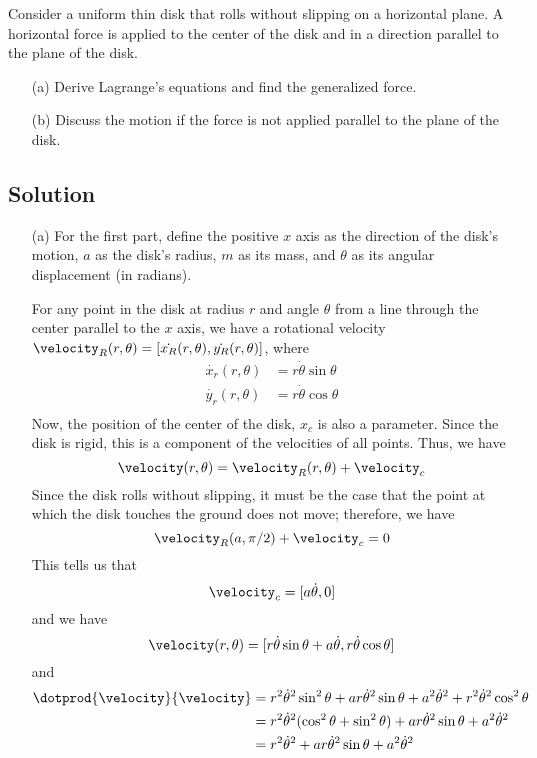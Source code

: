 Consider a uniform thin disk that rolls without slipping on a
horizontal plane.  A horizontal force is applied to the center of the
disk and in a direction parallel to the plane of the disk.
\begin{itemize}
\item[(a)] Derive Lagrange's equations and find the generalized force.
\item[(b)] Discuss the motion if the force is not applied parallel to the
  plane of the disk.
\end{itemize}

\subsection*{Solution}
\begin{itemize}
\item[(a)]
  For the first part, define the positive $x$ axis as the direction of
  the disk's motion, $a$ as the disk's radius, $m$ as its mass, and
  $\theta$ as its angular displacement (in radians).

  For any point in the disk at radius $r$ and angle $\theta$ from a line
  through the center parallel to the $x$ axis, we have a rotational
  velocity $\velocity_R(r, \theta) = [\dot{x_R}(r, \theta), \dot{y_R}(r,
    \theta)]$, where
  \begin{align*}
    \dot{x_r}(r, \theta) &= r\dot{\theta}\sin{\theta} \\
    \dot{y_r}(r, \theta) &= r\dot{\theta}\cos{\theta} \\
  \end{align*}
  Now, the position of the center of the disk, $x_c$ is also a
  parameter.  Since the disk is rigid, this is a component of the
  velocities of all points.  Thus, we have
  \[ \velocity(r, \theta) = \velocity_R(r, \theta) + \velocity_c \]
  Since the disk rolls without slipping, it must be the case that the
  point at which the disk touches the ground does not move; therefore,
  we have
  \[ \velocity_R(a, \pi/2) + \velocity_c = 0 \]
  This tells us that
  \[ \velocity_c = [a\dot{\theta}, 0] \]
  and we have
  \[
  \velocity(r, \theta) =
  [
    r\dot{\theta}\sin{\theta} + a\dot{\theta},
    r\dot{\theta}\cos{\theta}
  ]
  \]
  and
  \begin{align*}
    \dotprod{\velocity}{\velocity}
    &= r^2\dot{\theta}^2\sin^2{\theta} +
    ar\dot{\theta}^2\sin{\theta} +
    a^2\dot{\theta}^2 +
    r^2\dot{\theta}^2\cos^2{\theta} \\
    &= r^2\dot{\theta}^2(\cos^2{\theta} + \sin^2{\theta}) +
    ar\dot{\theta}^2\sin{\theta} +
    a^2\dot{\theta}^2 \\
    &= r^2\dot{\theta}^2 +
    ar\dot{\theta}^2\sin{\theta} +
    a^2\dot{\theta}^2 \\
  \end{align*}


\end{itemize}
